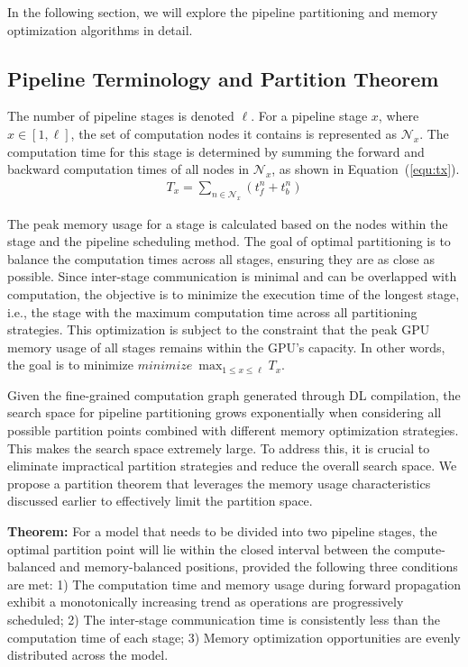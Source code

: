 In the following section, we will explore the pipeline partitioning and memory optimization algorithms in detail.

\subsection{Pipeline Terminology and Partition Theorem}
The number of pipeline stages is denoted $\ell$.
For a pipeline stage $x$, where $x \in [1, \ell]$,
the set of computation nodes it contains is represented as $\mathcal{N}_x$.
The computation time for this stage is determined by summing the
forward and backward computation times of all nodes in $\mathcal{N}_x$, as shown in Equation~(\ref{equ:tx}).
\begin{align}
  T_x=\sum_{n \in \mathcal{N}_x}\left(t_f^n+t_b^n\right)
\label{equ:tx}
\end{align}

The peak memory usage for a stage is calculated based on the nodes within the stage and the pipeline scheduling method.
The goal of optimal partitioning is to balance the computation times across all stages,
ensuring they are as close as possible.
Since inter-stage communication is minimal and can be overlapped with computation,
the objective is to minimize the execution time of the longest stage, i.e.,
the stage with the maximum computation time across all partitioning strategies.
This optimization is subject to the constraint that the peak GPU memory usage of
all stages remains within the GPU’s capacity.
In other words, the goal is to minimize $minimize\ \max_{1 \leq x \leq \ell} T_x$.

Given the fine-grained computation graph generated through DL compilation,
the search space for pipeline partitioning grows exponentially
when considering all possible partition points combined with different memory optimization strategies.
This makes the search space extremely large.
To address this, it is crucial to eliminate impractical partition strategies and reduce the overall search space.
We propose a partition theorem that leverages the memory usage characteristics discussed earlier
to effectively limit the partition space.

\textbf{Theorem:} For a model that needs to be divided into two pipeline stages,
the optimal partition point will lie within the closed interval between the
compute-balanced and memory-balanced positions, provided the following three conditions are met:
1) The computation time and memory usage during forward propagation exhibit
a monotonically increasing trend as operations are progressively scheduled;
2) The inter-stage communication time is consistently less than the computation time of each stage;
3) Memory optimization opportunities are evenly distributed across the model.


